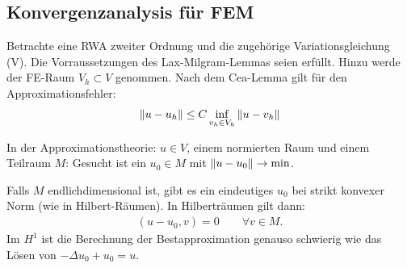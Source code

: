 \subsection{Konvergenzanalysis für FEM}
Betrachte eine RWA zweiter Ordnung und die zugehörige Variationsgleichung (V). Die Vorraussetzungen des Lax-Milgram-Lemmas seien erfüllt. 
Hinzu werde der FE-Raum $V_h \subset V$ genommen.
Nach dem Cea-Lemma gilt für den Approximationsfehler:
\begin{align*}
  \|u - u_h\| \leq C \inf_{v_h \in V_h} \|u - v_h\|
\end{align*}

In der Approximationstheorie: $u \in V$, einem normierten Raum und einem Teilraum $M$: Gesucht ist ein $u_0 \in M$ mit $\|u- u_0\| \to \min$.

Falls $M$ endlichdimensional ist, gibt es ein eindeutiges $u_0$ bei strikt konvexer Norm (wie in Hilbert-Räumen). 
In Hilberträumen gilt dann: 
\begin{align}\label{eq:gal_orth}
  (u-u_0, v) = 0 \qquad \forall v \in M.
\end{align}
Im $H^1$ ist die Berechnung der Bestapproximation genauso schwierig wie das Lösen von $- \Delta u_0 + u_0 = u$. 

